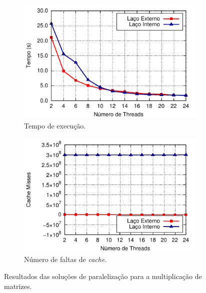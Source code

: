 \documentclass{SBCbookchapter}
\begin{document}
			\begin{figure}[t]
				\captionsetup[subfigure]{justification=centering}
				\centering
					\begin{subfigure}{0.45\linewidth}
						\includegraphics[width=\linewidth]{img/mm}
						\caption{Tempo de execução.}
						\label{figure: time mm}
					\end{subfigure}
					\quad
					\begin{subfigure}{0.45\linewidth}
						\includegraphics[width=\linewidth]{img/mm-cache}
						\caption{Número de faltas de \textit{cache}.}
						\label{figure: cache misses mm}
					\end{subfigure}
					\caption{Resultados das soluções de paralelização para a
					multiplicação de matrizes.}
			\end{figure}
			
\end{document}
